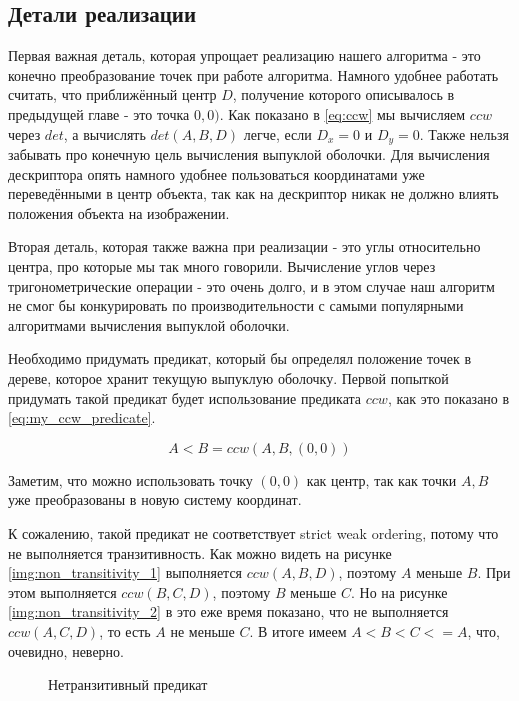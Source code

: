 \subsection{Детали реализации} \label{subsect2_2_2}

Первая важная деталь, которая упрощает реализацию нашего алгоритма - это конечно преобразование точек при работе алгоритма. Намного удобнее работать считать, что приближённый центр $D$, получение которого описывалось в предыдущей главе - это точка $0, 0)$. Как показано в \ref{eq:ccw} мы вычисляем $ccw$ через $det$, а вычислять $det(A, B, D)$ легче, если $D_x = 0$ и $D_y = 0$. Также нельзя забывать про конечную цель вычисления выпуклой оболочки. Для вычисления дескриптора опять намного удобнее пользоваться координатами уже переведёнными в центр объекта, так как на дескриптор никак не должно влиять положения объекта на изображении.

Вторая деталь, которая также важна при реализации - это углы относительно центра, про которые мы так много говорили. Вычисление углов через тригонометрические операции - это очень долго, и в этом случае наш алгоритм не смог бы конкурировать по производительности с самыми популярными алгоритмами вычисления выпуклой оболочки.

Необходимо придумать предикат, который бы определял положение точек в дереве, которое хранит текущую выпуклую оболочку. Первой попыткой придумать такой предикат будет использование предиката $ccw$, как это показано в \ref{eq:my_ccw_predicate}.

\begin{equation}\label{eq:my_ccw_predicate}
A<B=ccw(A, B, (0, 0))
\end{equation}

Заметим, что можно использовать точку $(0, 0)$ как центр, так как точки $A, B$ уже преобразованы в новую систему координат.

К сожалению, такой предикат не соответствует strict weak ordering, потому что не выполняется транзитивность. Как можно видеть на рисунке \ref{img:non_transitivity_1} выполняется $ccw(A, B, D)$, поэтому $A$ меньше $B$. При этом выполняется $ccw(B, C, D)$, поэтому $B$ меньше $C$. Но на рисунке \ref{img:non_transitivity_2} в это еже время показано, что не выполняется $ccw(A, C, D)$, то есть $A$ не меньше $C$. В итоге имеем $A < B < C <= A$, что, очевидно, неверно.

\begin{figure}[H]
	{\centering
		\hfill
		\hfill
		\hfill
	}
	\caption{Нетранзитивный предикат}
	\label{img:non_transitivity}
\end{figure}

